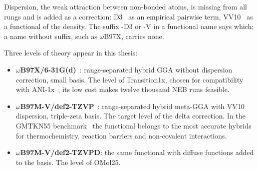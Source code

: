 \begin{table}[h]
\centering
\caption{Jacob's ladder of exchange--correlation
functionals~\cite{perdew2001}. Each rung uses the ingredients of the rungs
below and adds one.}
\label{tab:functionals}
\end{table}

Dispersion, the weak attraction between non-bonded atoms, is missing from
all rungs and is added as a correction: D3~\cite{grimme2010} as an
empirical pairwise term, VV10~\cite{vydrov2010} as a functional of the
density. The suffix -D3 or -V in a functional name says which; a name
without suffix, such as $\omega$B97X, carries none.

Three levels of theory appear in this thesis:

\begin{itemize}
  \item \textbf{$\omega$B97X/6-31G(d)}~\cite{chai2008}: range-separated
    hybrid GGA without dispersion correction, small basis. The level of
    Transition1x, chosen for compatibility with
    ANI-1x~\cite{schreiner2022}; its low cost makes twelve thousand NEB
    runs feasible.
  \item \textbf{$\omega$B97M-V/def2-TZVP}~\cite{mardirossian2016}:
    range-separated hybrid meta-GGA with VV10 dispersion, triple-zeta
    basis. The target level of the delta correction. In the GMTKN55
    benchmark~\cite{goerigk2017, najibi2018} the functional belongs to the most
    accurate hybrids for thermochemistry, reaction barriers and
    non-covalent interactions.
  \item \textbf{$\omega$B97M-V/def2-TZVPD}: the same functional with
    diffuse functions added to the basis. The level of OMol25.
\end{itemize}

